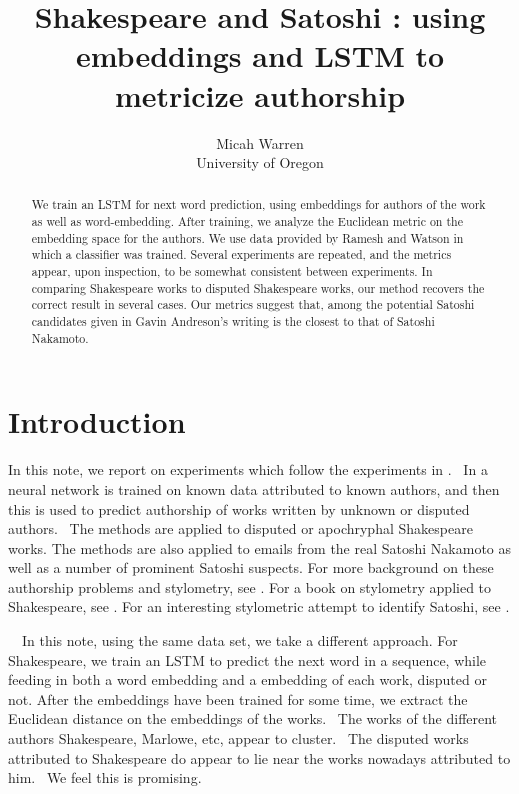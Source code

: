 \documentclass{article}%
\begin{document}
\title{Shakespeare and Satoshi : using embeddings and LSTM to metricize
authorship}
\author{Micah Warren\\University of Oregon}
\maketitle


\begin{abstract}
We train an LSTM for next word prediction, using embeddings for authors of the work as well as word-embedding.   After training, we analyze the Euclidean metric on the embedding space for the authors.  We use data provided by Ramesh and Watson \cite{RWgithub} in which a classifier was trained.  Several experiments are repeated, and the metrics appear, upon inspection, to be somewhat consistent between experiments.  In comparing Shakespeare works to disputed Shakespeare works, our method recovers the correct result in several cases.  Our metrics suggest that, among the potential Satoshi candidates given in \cite{RW} Gavin Andreson's writing is the closest to that of Satoshi Nakamoto.
\end{abstract}

\section{Introduction}


In this note, we report on experiments which follow the experiments
in \cite{RW}. \ In \cite{RW} a neural network is trained on known data
attributed to known authors, and then this is used to predict authorship of works written by 
unknown or disputed authors. \ The methods are applied to disputed or apochryphal
Shakespeare works.   The methods are also applied to emails from the real Satoshi Nakamoto as well as a number
of prominent Satoshi suspects.  For more background on these authorship problems and stylometry, see \cite{RW}. For a book on stylometry applied to Shakespeare, see \cite{M}.  For an interesting stylometric attempt to identify Satoshi, see \cite{SG}.

\ \ In this note, using the same data set, we
take a different approach. For Shakespeare, we train an LSTM to predict the next word in a sequence,
while feeding in both a word embedding and a embedding of each work, disputed
or not. After the embeddings have been trained for some time, we extract the
Euclidean distance on the embeddings of the works. \ The works of the different
authors Shakespeare, Marlowe, etc, appear to cluster. \ The disputed works
attributed to Shakespeare do appear to lie near the works nowadays attributed to
him. \ We feel this is promising. \ 
\end{document}
